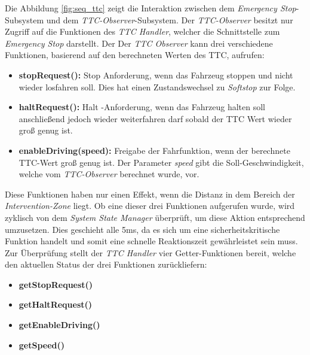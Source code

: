 Die Abbildung \ref{fig:seq_ttc} zeigt die Interaktion 
zwischen dem \emph{Emergency Stop}-Subsystem und
dem \emph{TTC-Observer}-Subsystem. Der \emph{TTC-Observer}
besitzt nur Zugriff auf die Funktionen des \emph{TTC Handler},
welcher die Schnittstelle zum \emph{Emergency Stop} darstellt.
Der
Der \emph{TTC Observer} kann drei verschiedene Funktionen,
basierend auf den berechneten Werten des TTC, aufrufen:
\begin{itemize}[leftmargin=*, itemsep=2pt]
  \item \textbf{stopRequest():} Stop Anforderung, wenn das Fahrzeug stoppen und nicht wieder losfahren soll. Dies hat einen Zustandswechsel zu \emph{Softstop} zur Folge.
  \item \textbf{haltRequest():} Halt -Anforderung, wenn das Fahrzeug halten soll anschließend jedoch wieder weiterfahren darf sobald der TTC Wert wieder groß genug ist.
  \item \textbf{enableDriving(speed):} Freigabe der Fahrfunktion, wenn der berechnete TTC-Wert groß genug ist. 
  Der Parameter \emph{speed} gibt die Soll-Geschwindigkeit, welche vom \emph{TTC-Observer} berechnet wurde, vor.
\end{itemize}
Diese Funktionen haben nur einen Effekt, wenn die Distanz in dem Bereich der \emph{Intervention-Zone} liegt.
Ob eine dieser drei Funktionen aufgerufen wurde,
wird zyklisch von dem \emph{System State Manager}
überprüft, um diese Aktion entsprechend umzusetzen.
Dies geschieht alle 5ms, da es sich um eine sicherheitskritische Funktion handelt und somit eine schnelle Reaktionszeit gewährleistet sein muss.
Zur Überprüfung stellt der \emph{TTC Handler} vier Getter-Funktionen bereit, welche den aktuellen Status der drei Funktionen zurückliefern:
\begin{itemize}[leftmargin=*, itemsep=2pt]
  \item \textbf{getStopRequest()}
  \item \textbf{getHaltRequest()}
  \item \textbf{getEnableDriving()}
  \item \textbf{getSpeed()}
\end{itemize}


